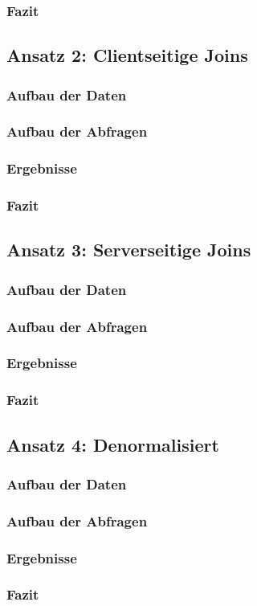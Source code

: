 \subsubsection{Fazit}


\subsection{Ansatz 2: Clientseitige Joins}
\subsubsection{Aufbau der Daten}
\subsubsection{Aufbau der Abfragen}
\subsubsection{Ergebnisse}
\subsubsection{Fazit}


\subsection{Ansatz 3: Serverseitige Joins}
\subsubsection{Aufbau der Daten}
\subsubsection{Aufbau der Abfragen}
\subsubsection{Ergebnisse}
\subsubsection{Fazit}


\subsection{Ansatz 4: Denormalisiert}
\subsubsection{Aufbau der Daten}
\subsubsection{Aufbau der Abfragen}
\subsubsection{Ergebnisse}
\subsubsection{Fazit}